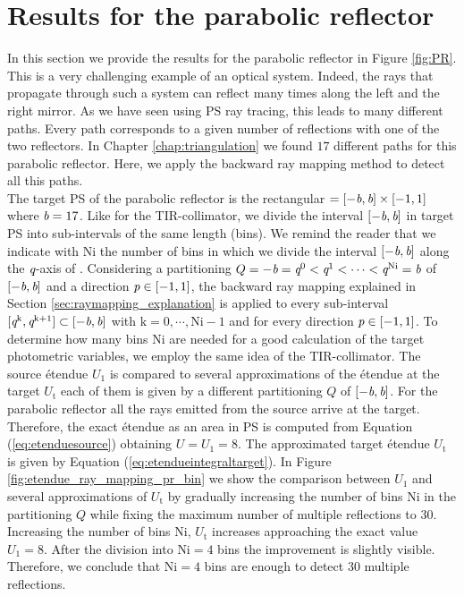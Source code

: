 \section{Results for the parabolic reflector}\label{sec:PR}
In this section we provide the results for the parabolic reflector in Figure \ref{fig:PR}.
This is a very challenging example of an optical system. Indeed, the rays that propagate through such a system can reflect many times along the left and the right mirror. As we have seen using PS ray tracing, this leads to many different paths. Every path corresponds to a given number of reflections with one of the two reflectors. In Chapter \ref{chap:triangulation} we found $17$ different paths for this parabolic reflector. Here, we apply the backward ray mapping method to detect all this paths. \\ \indent
The target PS of the parabolic reflector is the rectangular $=[-\textit{b}, \textit{b}]\times[-1,1]$ where $\textit{b}=17$. Like for the TIR-collimator, we divide the interval $[-\textit{b}, \textit{b}]$ in target PS into sub-intervals of the same length (bins). We remind the reader that we indicate with $\textrm{Ni}$ the number of bins in which we divide the interval $[-\textit{b}, \textit{b}]$ along the $\textit{q}$-axis of . Considering a partitioning $Q = -\textit{b}=\textit{q}^{0}<\textit{q}^{1}<\cdots<\textit{q}^{\textrm{Ni}}=\textit{b}$ of $[-\textit{b}, \textit{b}]$ and a direction $\textit{p}\in[-1,1]$, the backward ray mapping explained in Section \ref{sec:raymapping_explanation} is applied to every sub-interval $[\textit{q}^{\textrm{k}}, \textit{q}^{\textrm{k+1}}]\subset[-\textit{b}, \textit{b}]$ with $\textrm{k}=0, \cdots, \textrm{Ni}-1$ and for every direction $\textit{p}\in[-1,1]$. To determine how many bins $\textrm{Ni}$ are needed for a good calculation of the target photometric variables, we employ the same idea of the TIR-collimator. The source \'{e}tendue $U_1$ is compared to several approximations of the \'{e}tendue at the target $U_{\textrm{t}}$ each of them is given by a different partitioning $Q$ of $[-\textit{b}, \textit{b}]$. For the parabolic reflector all the rays emitted from the source arrive at the target. Therefore, the exact \'{e}tendue as an area in PS is computed from Equation (\ref{eq:etenduesource}) obtaining $U=U_1=8$. The approximated target \'{e}tendue $U_{\textrm{t}}$ is given by Equation (\ref{eq:etendueintegraltarget}). In Figure \ref{fig:etendue_ray_mapping_pr_bin} we show the comparison between $U_1$ and several approximations of $U_{\textrm{t}}$ by gradually increasing the number of bins $\textrm{Ni}$ in the partitioning $Q$ while fixing the maximum number of multiple reflections to $30$. Increasing the number of bins $\textrm{Ni}$, $U_{\textrm{t}}$ increases approaching the exact value $U_1=8$. After the division into $\textrm{Ni}=4$ bins the improvement is slightly visible. Therefore, we conclude that $\textrm{Ni}=4$ bins are enough to detect $30$ multiple reflections.
